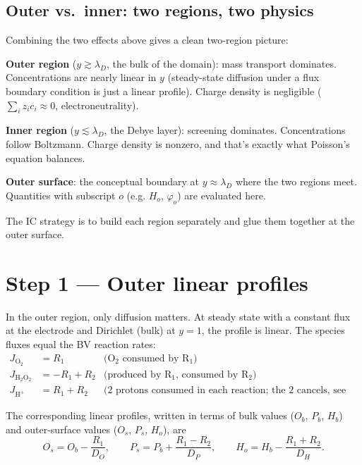 \documentclass[11pt]{article}
\newcommand{\lD}{\lambda_D}
\begin{document}
\subsection{Outer vs.\ inner: two regions, two physics}

Combining the two effects above gives a clean two-region picture:

\begin{tcolorbox}[notebox, title={The two-region picture}]
\textbf{Outer region} ($y \gtrsim \lD$, the bulk of the domain):
mass transport dominates. Concentrations are nearly linear in $y$
(steady-state diffusion under a flux boundary condition is just a
linear profile). Charge density is negligible
($\sum_i z_i c_i \approx 0$, electroneutrality).
\medskip

\textbf{Inner region} ($y \lesssim \lD$, the Debye layer): screening
dominates. Concentrations follow Boltzmann. Charge density is
nonzero, and that's exactly what Poisson's equation balances.
\medskip

\textbf{Outer surface}: the conceptual boundary at $y \approx \lD$
where the two regions meet. Quantities with subscript $o$ (e.g.
$H_o$, $\varphi_o$) are evaluated here.
\end{tcolorbox}

The IC strategy is to build each region separately and glue them
together at the outer surface.

\section{Step 1 --- Outer linear profiles}

In the outer region, only diffusion matters. At steady state with a
constant flux at the electrode and Dirichlet (bulk) at $y = 1$, the
profile is linear. The species fluxes equal the BV reaction rates:
\begin{align}
  J_{\mathrm{O_2}}     &=  R_1                  & \text{(O$_2$ consumed by R$_1$)} \\
  J_{\mathrm{H_2O_2}}  &= -R_1 + R_2            & \text{(produced by R$_1$, consumed by R$_2$)} \\
  J_{\mathrm{H^+}}     &=  R_1 + R_2            & \text{(2 protons consumed in each reaction; the 2 cancels, see below)}
\end{align}

The corresponding linear profiles, written in terms of bulk values
($O_b$, $P_b$, $H_b$) and outer-surface values ($O_s$, $P_s$, $H_o$),
are
\begin{equation}
  \boxed{\;
  O_s = O_b - \frac{R_1}{D_O},\qquad
  P_s = P_b + \frac{R_1 - R_2}{D_P},\qquad
  H_o = H_b - \frac{R_1 + R_2}{D_H}.\;}
\end{equation}
\end{document}
